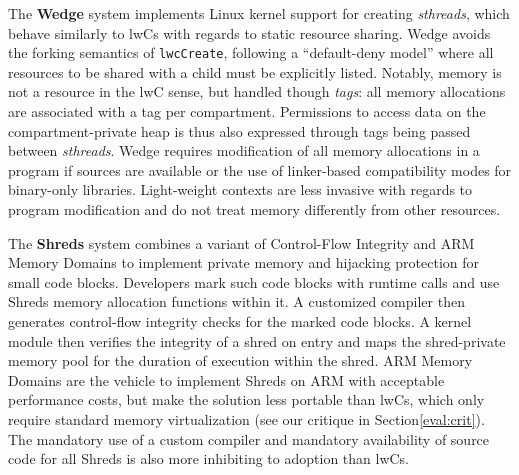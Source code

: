\documentclass[10pt,twocolumn,a4paper]{article}
\begin{document}

The \textbf{Wedge} system implements Linux kernel support for creating \textit{sthreads}, which behave similarly to lwCs with regards to static resource sharing.
Wedge avoids the forking semantics of \lstinline{lwcCreate}, following a \enquote{default-deny model} where all resources to be shared with a child must be explicitly listed.
Notably, memory is not a resource in the lwC sense, but handled though \textit{tags}: all memory allocations are associated with a tag per compartment.
Permissions to access data on the compartment-private heap is thus also expressed through tags being passed between \textit{sthreads}.
Wedge requires modification of all memory allocations in a program if sources are available or the use of linker-based compatibility modes for binary-only libraries.
Light-weight contexts are less invasive with regards to program modification and do not treat memory differently from other resources.
\cite{bittau2008wedge}

The \textbf{Shreds} system combines a variant of Control-Flow Integrity and ARM Memory Domains to implement private memory and hijacking protection for small code blocks.
Developers mark such code blocks with runtime calls and use Shreds memory allocation functions within it.
A customized compiler then generates control-flow integrity checks for the marked code blocks.
A kernel module then verifies the integrity of a shred on entry and maps the shred-private memory pool for the duration of execution within the shred.
ARM Memory Domains are the vehicle to implement Shreds on ARM with acceptable performance costs, but make the solution less portable than lwCs, which only require standard memory virtualization (see our critique in Section\ref{eval:crit}).
The mandatory use of a custom compiler and mandatory availability of source code for all Shreds is also more inhibiting to adoption than lwCs.
\cite{chen2016shreds,abadi2009control,armmemorydomains}

  
  
\end{document}
